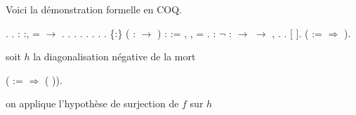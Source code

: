 Voici la démonstration formelle en COQ.
\\


\begin{coqdoccode}
\coqdocnoindent
{}  .\coqdoceol
\coqdocemptyline
\coqdocnoindent
{} .\coqdoceol
\coqdocemptyline
\coqdocnoindent
{}  : \coqdockw{\ensuremath{\forall}} :,   = \ensuremath{\rightarrow} .\coqdoceol
\coqdocnoindent
{}.\coqdoceol
\coqdocindent{2.00em}
.\coqdoceol
\coqdocindent{2.00em}
   .\coqdoceol
\coqdocindent{2.00em}
 .  .  .\coqdoceol
\coqdocnoindent
{}.\coqdoceol
\coqdocemptyline
\coqdocnoindent
{}  \{:\} ( :  \ensuremath{\rightarrow} ) :  := \coqdockw{\ensuremath{\forall}} , \coqdoctac{\ensuremath{\exists}} ,   = .\coqdoceol
\coqdocemptyline
\coqdocnoindent
{}  : \ensuremath{\lnot} \coqdoctac{\ensuremath{\exists}}  :  \ensuremath{\rightarrow}  \ensuremath{\rightarrow} ,  .\coqdoceol
\coqdocnoindent
{}.\coqdoceol
\coqdocindent{2.00em}
 [ ].\coqdoceol
\coqdocindent{2.00em}
 ( :=   \ensuremath{\Rightarrow}   ).\coqdoceol
\coqdocemptyline
\end{coqdoccode}
soit $h$ la diagonalisation négative de la mort 

\begin{coqdoccode}
\coqdocindent{2.00em}
 ( :=   \ensuremath{\Rightarrow}  (  )).\coqdoceol
\coqdocemptyline
\end{coqdoccode}
on applique l'hypothèse de surjection de $f$ sur $h$

